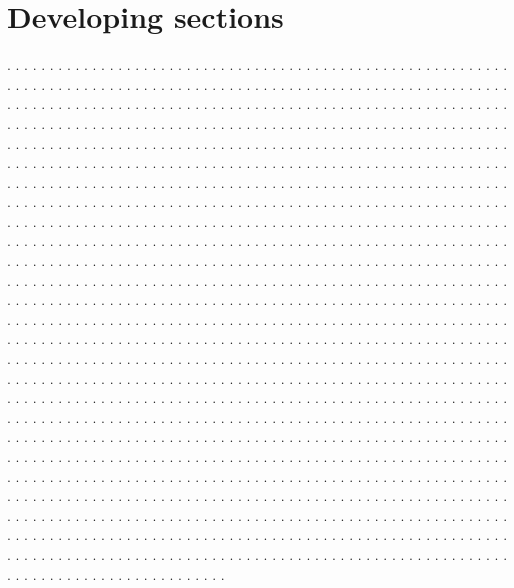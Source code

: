 \documentclass[twocolumn]{revtex4}
\begin{document}
\section{Developing sections}
. . . . . . . . . . . . . . . . . . . . . . . . . . . . . . . . . . . . . . . .
. . . . . . . . . . . . . . . . . . . . . . . . . . . . . . . . . . . . . . . .
. . . . . . . . . . . . . . . . . . . . . . . . . . . . . . . . . . . . . . . .
. . . . . . . . . . . . . . . . . . . . . . . . . . . . . . . . . . . . . . . .
. . . . . . . . . . . . . . . . . . . . . . . . . . . . . . . . . . . . . . . .
. . . . . . . . . . . . . . . . . . . . . . . . . . . . . . . . . . . . . . . .
. . . . . . . . . . . . . . . . . . . . . . . . . . . . . . . . . . . . . . . .
. . . . . . . . . . . . . . . . . . . . . . . . . . . . . . . . . . . . . . . .
. . . . . . . . . . . . . . . . . . . . . . . . . . . . . . . . . . . . . . . .
. . . . . . . . . . . . . . . . . . . . . . . . . . . . . . . . . . . . . . . .
. . . . . . . . . . . . . . . . . . . . . . . . . . . . . . . . . . . . . . . .
. . . . . . . . . . . . . . . . . . . . . . . . . . . . . . . . . . . . . . . .
. . . . . . . . . . . . . . . . . . . . . . . . . . . . . . . . . . . . . . . .
. . . . . . . . . . . . . . . . . . . . . . . . . . . . . . . . . . . . . . . .
. . . . . . . . . . . . . . . . . . . . . . . . . . . . . . . . . . . . . . . .
. . . . . . . . . . . . . . . . . . . . . . . . . . . . . . . . . . . . . . . .
. . . . . . . . . . . . . . . . . . . . . . . . . . . . . . . . . . . . . . . .
. . . . . . . . . . . . . . . . . . . . . . . . . . . . . . . . . . . . . . . .
. . . . . . . . . . . . . . . . . . . . . . . . . . . . . . . . . . . . . . . .
. . . . . . . . . . . . . . . . . . . . . . . . . . . . . . . . . . . . . . . .
. . . . . . . . . . . . . . . . . . . . . . . . . . . . . . . . . . . . . . . .
. . . . . . . . . . . . . . . . . . . . . . . . . . . . . . . . . . . . . . . .
. . . . . . . . . . . . . . . . . . . . . . . . . . . . . . . . . . . . . . . .
. . . . . . . . . . . . . . . . . . . . . . . . . . . . . . . . . . . . . . . .
. . . . . . . . . . . . . . . . . . . . . . . . . . . . . . . . . . . . . . . .
. . . . . . . . . . . . . . . . . . . . . . . . . . . . . . . . . . . . . . . .
. . . . . . . . . . . . . . . . . . . . . . . . . . . . . . . . . . . . . . . .
. . . . . . . . . . . . . . . . . . . . . . . . . . . . . . . . . . . . . . . .
. . . . . . . . . . . . . . . . . . . . . . . . . . . . . . . . . . . . . . . .
. . . . . . . . . . . . . . . . . . . . . . . . . . . . . . . . . . . . . . . .
. . . . . . . . . . . . . . . . . . . . . . . . . . . . . . . . . . . . . . . .
. . . . . . . . . . . . . . . . . . . . . . . . . . . . . . . . . . . . . . . .
. . . . . . . . . . . . . . . . . . . . . . . . . . . . . . . . . . . . . . . .
. . . . . . . . . . . . . . . . . . . . . . . . . . . . . . . . . . . . . . . .
. . . . . . . . . . . . . . . . . . . . . . . . . . . . . . . . . . . . . . . .
. . . . . . . . . . . . . . . . . . . . . . . . . . . . . . . . . . . . . . . .
. . . . . . . . . . . . . . . . . . . . . . . . . . . . . . . . . . . . . . . .
. . . . . . . . . . . . . . . . . . . . . . . . . . . . . . . . . . . . . . . .
. . . . . . . . . . . . . . . . . . . . . . . . . . . . . . . . . . . . . . . .
\end{document}
